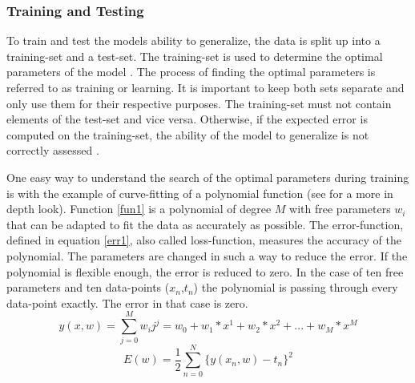 \subsubsection*{Training and Testing}\label{TT}
To train and test the models ability to generalize, the data is split up into a training-set and a test-set. The training-set is used to determine the optimal parameters of the model \cite{Bishop}. The process of finding the optimal parameters is referred to as training or learning. It is important to keep both sets separate and only use them for their respective purposes. The training-set must not contain elements of the test-set and vice versa. Otherwise, if the expected error is computed on the training-set, the ability of the model to generalize is not correctly assessed \cite{Xiaogang}.

One easy way to understand the search of the optimal parameters during training is with the example of curve-fitting of a polynomial function (see \cite{Bishop} for a more in depth look). \newline
Function \ref{fun1} is a polynomial of degree \(M\) with free parameters \(w_i\) that can be adapted to fit the data as accurately as possible.
The error-function, defined in equation \ref{err1}, also called loss-function, measures the accuracy of the polynomial. The parameters are changed in such a way to reduce the error. If the polynomial is flexible enough, the error is reduced to zero. In the case of ten free parameters and ten data-points (\(x_n\),\(t_n\)) the polynomial is passing through every data-point exactly. The error in that case is zero. 
\begin{equation}\label{fun1}
	y(x,w) = \sum_{j=0}^{M}w_ij^j= w_0+w_1*x^1+w_2*x^2+...+w_M*x^M
\end{equation}
\begin{equation}\label{err1}
	E(w) = \frac{1}{2}\sum_{n=0}^{N}\{y(x_n,w)-t_n\}^2
\end{equation}

